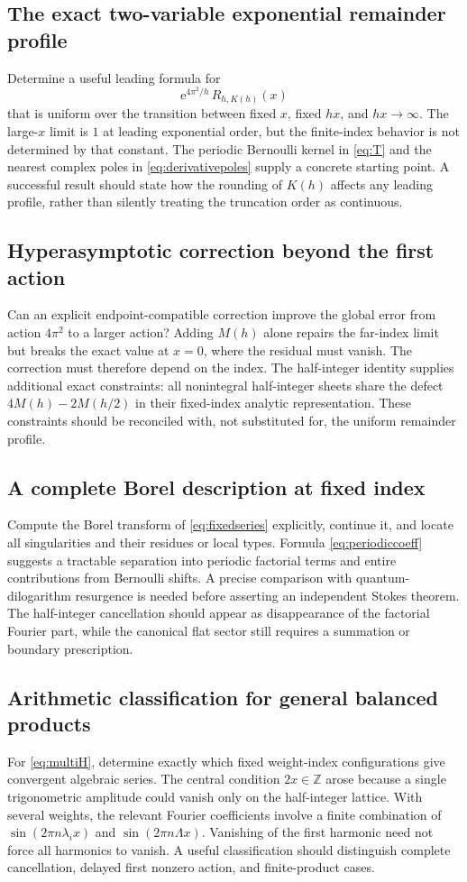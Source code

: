 \documentclass[11pt,a4paper]{article}
\numberwithin{equation}{section}
\theoremstyle{definition}
\newcommand{\Z}{\mathbb Z}
\newcommand{\ee}{\mathrm e}
\begin{document}
\subsection{The exact two-variable exponential remainder profile}
Determine a useful leading formula for
\[
\ee^{4\pi^2/h}\,R_{h,K(h)}(x)
\]
that is uniform over the transition between fixed $x$, fixed $hx$, and $hx\to\infty$. The large-$x$ limit is $1$ at leading exponential order, but the finite-index behavior is not determined by that constant. The periodic Bernoulli kernel in \eqref{eq:T} and the nearest complex poles in \eqref{eq:derivativepoles} supply a concrete starting point. A successful result should state how the rounding of $K(h)$ affects any leading profile, rather than silently treating the truncation order as continuous.

\subsection{Hyperasymptotic correction beyond the first action}
Can an explicit endpoint-compatible correction improve the global error from action $4\pi^2$ to a larger action? Adding $M(h)$ alone repairs the far-index limit but breaks the exact value at $x=0$, where the residual must vanish. The correction must therefore depend on the index. The half-integer identity supplies additional exact constraints: all nonintegral half-integer sheets share the defect $4M(h)-2M(h/2)$ in their fixed-index analytic representation. These constraints should be reconciled with, not substituted for, the uniform remainder profile.

\subsection{A complete Borel description at fixed index}
Compute the Borel transform of \eqref{eq:fixedseries} explicitly, continue it, and locate all singularities and their residues or local types. Formula \eqref{eq:periodiccoeff} suggests a tractable separation into periodic factorial terms and entire contributions from Bernoulli shifts. A precise comparison with quantum-dilogarithm resurgence \cite{gk} is needed before asserting an independent Stokes theorem. The half-integer cancellation should appear as disappearance of the factorial Fourier part, while the canonical flat sector still requires a summation or boundary prescription.

\subsection{Arithmetic classification for general balanced products}
For \eqref{eq:multiH}, determine exactly which fixed weight-index configurations give convergent algebraic series. The central condition $2x\in\Z$ arose because a single trigonometric amplitude could vanish only on the half-integer lattice. With several weights, the relevant Fourier coefficients involve a finite combination of $\sin(2\pi n\lambda_i x)$ and $\sin(2\pi n\Lambda x)$. Vanishing of the first harmonic need not force all harmonics to vanish. A useful classification should distinguish complete cancellation, delayed first nonzero action, and finite-product cases.
\end{document}
